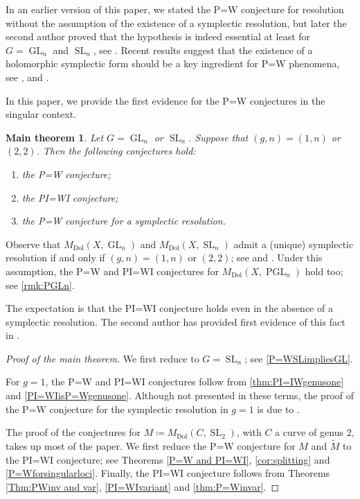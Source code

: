 \documentclass[JEP,XML,SOM,Unicode, NoEqCountersInSection,NoFloatCountersInSection,published]{cedram}
\newtheorem*{mainthm}{Main theorem}
\theoremstyle{definition}
\newcommand{\Gl}{\operatorname{GL}}
\newcommand{\Sl}{\operatorname{SL}}
\newcommand{\PGl}{\operatorname{PGL}}
\newcommand{\MDolGl}{{M}_{\mathrm{Dol}}(X, \Gl_n)}
\newcommand{\MDolSl}{{M}_{\mathrm{Dol}}(X, \Sl_n)}
\newcommand{\MDolPGl}{{M}_{\mathrm{Dol}}(X, \PGl_n)}
\begin{document}
In an earlier version of this paper, we stated the P=W conjecture for resolution without the assumption of the existence of a symplectic resolution, but later the second author proved that
the hypothesis is indeed essential at least for $G=\Gl_n$ and $\Sl_n$, see \cite[\S 5.6]{Mauri2021}. Recent results suggest that the existence of a holomorphic symplectic form should be a key ingredient for P=W phenomena, see \cite[\S 4.4]{deCataldoHauselMigliorini2013}, \cite{Mellit2019} and \cite[Th.\,1.7]{Harder2019}.

In this paper, we provide the first evidence for the P=W conjectures in the singular context.

\begin{mainthm}
Let $G=\Gl_n$ or $\Sl_n$. Suppose that $(g,n)=(1,n)$ or $(2,2)$. Then the following conjectures hold:
\begin{enumerate}
\item the P=W conjecture;
\item the PI=WI conjecture;
\item the P=W conjecture for a symplectic resolution.
\end{enumerate}
\end{mainthm}
Observe that $\MDolGl$ and $\MDolSl$ admit a (unique) symplectic resolution if and only if $(g,n)=(1,n)$ or $(2,2)$; see \cite{BellamySchedler2019} and \cite[Th.\,2.2]{FuNamikawa04}. Under this assumption, the P=W and PI=WI conjectures for $\MDolPGl$ hold too; see \hbox{\cref{rmk:PGLn}}.

The expectation is that the PI=WI conjecture holds even in the absence of a symplectic resolution. The second author has provided first evidence of this fact in \cite[\S 5]{Mauri2021}.
\begin{proof}[Proof of the main theorem]
We first reduce to $G=\Sl_n$; see \cref{P=WSLimpliesGL}.

For $g=1$, the P=W and PI=WI conjectures follow from \cref{thm:PI=IWgenusone} and
\hbox{\cref{PI=WIisP=Wgenusone}}.
Although not presented in these terms, the proof of the P=W conjecture for the symplectic resolution in $g=1$ is due to \cite{deCataldoHauselMigliorini2013}.

The proof of the conjectures for $M \coloneqq M_{\mathrm{Dol}}(C, \Sl_2)$, with $C$ a curve of genus $2$, takes up most of the paper. We first reduce the P=W conjecture for $M$ and $\widetilde{M}$ to the PI=WI conjecture; see Theorems \ref{P=W and PI=WI}, \ref{cor:splitting} and \ref{P=Wforsingularloci}. Finally, the PI=WI conjecture follows from Theorems \ref{Thm:PWinv and var}, \ref{PI=WIvariant} and \ref{thm:P=Winvar}.
\end{proof}
\end{document}
